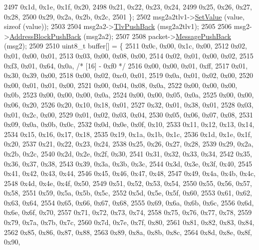 \begin{DoxyCode}
2497       0x1d, 0x1e, 0x1f, 0x20,
2498       0x21, 0x22, 0x23, 0x24,
2499       0x25, 0x26, 0x27, 0x28,
2500       0x29, 0x2a, 0x2b, 0x2c,
2501     \};
2502     msg2a2tlv1->\hyperlink{classns3_1_1PbbTlv_a1ca7d32f9b68990225f3267c2cc09f11}{SetValue} (value, \textcolor{keyword}{sizeof} (value));
2503 
2504     msg2a2->\hyperlink{classns3_1_1PbbAddressBlock_a6e33cd1452dd3ff753de3e3c99e473a5}{TlvPushBack} (msg2a2tlv1);
2505 
2506     msg2->\hyperlink{classns3_1_1PbbMessage_a5f623bad2fb1adde7da885e1c92d5311}{AddressBlockPushBack} (msg2a2);
2507 
2508     packet->\hyperlink{classns3_1_1PbbPacket_a4a3170001ef758d9c9c4375b8f089826}{MessagePushBack} (msg2);
2509 
2510     uint8\_t buffer[] = \{
2511       0x0c, 0x00, 0x1c, 0x00,
2512       0x02, 0x01, 0x00, 0x01,
2513       0x03, 0x00, 0x08, 0x00,
2514       0x02, 0x01, 0x00, 0x02,
2515       0xf3, 0x01, 0x64, 0x0a,   \textcolor{comment}{/* [16] - 0xf0 */}
2516       0x00, 0x00, 0x01, 0xff,
2517       0x01, 0x30, 0x39, 0x00,
2518       0x00, 0x02, 0xc0, 0x01,
2519       0x0a, 0x01, 0x02, 0x00,
2520       0x00, 0x01, 0x01, 0x00,
2521       0x00, 0x04, 0x08, 0x0a,
2522       0x00, 0x00, 0x00, 0x0b,
2523       0x00, 0x00, 0x00, 0x0a,
2524       0x00, 0x00, 0x05, 0x0a,
2525       0x00, 0x00, 0x06, 0x20,
2526       0x20, 0x10, 0x18, 0x01,
2527       0x32, 0x01, 0x38, 0x01,
2528       0x03, 0x01, 0x2c, 0x00,
2529       0x01, 0x02, 0x03, 0x04,
2530       0x05, 0x06, 0x07, 0x08,
2531       0x09, 0x0a, 0x0b, 0x0c,
2532       0x0d, 0x0e, 0x0f, 0x10,
2533       0x11, 0x12, 0x13, 0x14,
2534       0x15, 0x16, 0x17, 0x18,
2535       0x19, 0x1a, 0x1b, 0x1c,
2536       0x1d, 0x1e, 0x1f, 0x20,
2537       0x21, 0x22, 0x23, 0x24,
2538       0x25, 0x26, 0x27, 0x28,
2539       0x29, 0x2a, 0x2b, 0x2c,
2540       0x2d, 0x2e, 0x2f, 0x30,
2541       0x31, 0x32, 0x33, 0x34,
2542       0x35, 0x36, 0x37, 0x38,
2543       0x39, 0x3a, 0x3b, 0x3c,
2544       0x3d, 0x3e, 0x3f, 0x40,
2545       0x41, 0x42, 0x43, 0x44,
2546       0x45, 0x46, 0x47, 0x48,
2547       0x49, 0x4a, 0x4b, 0x4c,
2548       0x4d, 0x4e, 0x4f, 0x50,
2549       0x51, 0x52, 0x53, 0x54,
2550       0x55, 0x56, 0x57, 0x58,
2551       0x59, 0x5a, 0x5b, 0x5c,
2552       0x5d, 0x5e, 0x5f, 0x60,
2553       0x61, 0x62, 0x63, 0x64,
2554       0x65, 0x66, 0x67, 0x68,
2555       0x69, 0x6a, 0x6b, 0x6c,
2556       0x6d, 0x6e, 0x6f, 0x70,
2557       0x71, 0x72, 0x73, 0x74,
2558       0x75, 0x76, 0x77, 0x78,
2559       0x79, 0x7a, 0x7b, 0x7c,
2560       0x7d, 0x7e, 0x7f, 0x80,
2561       0x81, 0x82, 0x83, 0x84,
2562       0x85, 0x86, 0x87, 0x88,
2563       0x89, 0x8a, 0x8b, 0x8c,
2564       0x8d, 0x8e, 0x8f, 0x90,

\end{DoxyCode}
